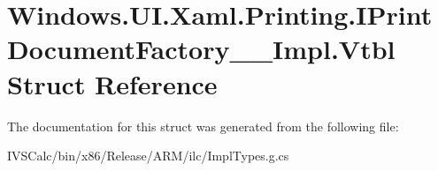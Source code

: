\hypertarget{struct_windows_1_1_u_i_1_1_xaml_1_1_printing_1_1_i_print_document_factory_____impl_1_1_vtbl}{}\section{Windows.\+U\+I.\+Xaml.\+Printing.\+I\+Print\+Document\+Factory\+\_\+\+\_\+\+Impl.\+Vtbl Struct Reference}
\label{struct_windows_1_1_u_i_1_1_xaml_1_1_printing_1_1_i_print_document_factory_____impl_1_1_vtbl}


The documentation for this struct was generated from the following file\+:\begin{DoxyCompactItemize}
\item 
I\+V\+S\+Calc/bin/x86/\+Release/\+A\+R\+M/ilc/Impl\+Types.\+g.\+cs\end{DoxyCompactItemize}
